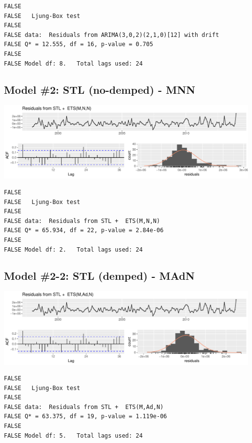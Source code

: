 \documentclass[openany]{book}
\begin{document}
\begin{verbatim}
FALSE 
FALSE   Ljung-Box test
FALSE 
FALSE data:  Residuals from ARIMA(3,0,2)(2,1,0)[12] with drift
FALSE Q* = 12.555, df = 16, p-value = 0.705
FALSE 
FALSE Model df: 8.   Total lags used: 24
\end{verbatim}

\subsection{Model \#2: STL (no-demped) -
MNN}\label{model-2-stl-no-demped---mnn}

\includegraphics{Part-B-AS_files/figure-latex/unnamed-chunk-5-1.pdf}

\begin{verbatim}
FALSE 
FALSE   Ljung-Box test
FALSE 
FALSE data:  Residuals from STL +  ETS(M,N,N)
FALSE Q* = 65.934, df = 22, p-value = 2.84e-06
FALSE 
FALSE Model df: 2.   Total lags used: 24
\end{verbatim}

\subsection{Model \#2-2: STL (demped) -
MAdN}\label{model-2-2-stl-demped---madn}

\includegraphics{Part-B-AS_files/figure-latex/unnamed-chunk-6-1.pdf}

\begin{verbatim}
FALSE 
FALSE   Ljung-Box test
FALSE 
FALSE data:  Residuals from STL +  ETS(M,Ad,N)
FALSE Q* = 63.375, df = 19, p-value = 1.119e-06
FALSE 
FALSE Model df: 5.   Total lags used: 24
\end{verbatim}
\end{document}
